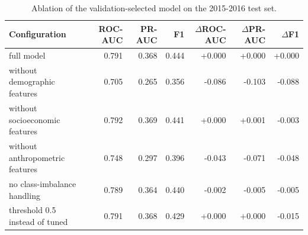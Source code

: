 \begin{table}[t]
\centering
\footnotesize
\caption{Ablation of the validation-selected model on the 2015-2016 test set.}
\label{tab:ablation}
\begin{tabular}{lrrrrrr}
\toprule
Configuration & ROC-AUC & PR-AUC & F1 & $\Delta$ROC-AUC & $\Delta$PR-AUC & $\Delta$F1 \\
\midrule
full model & 0.791 & 0.368 & 0.444 & +0.000 & +0.000 & +0.000 \\
without demographic features & 0.705 & 0.265 & 0.356 & -0.086 & -0.103 & -0.088 \\
without socioeconomic features & 0.792 & 0.369 & 0.441 & +0.000 & +0.001 & -0.003 \\
without anthropometric features & 0.748 & 0.297 & 0.396 & -0.043 & -0.071 & -0.048 \\
no class-imbalance handling & 0.789 & 0.364 & 0.440 & -0.002 & -0.005 & -0.005 \\
threshold 0.5 instead of tuned & 0.791 & 0.368 & 0.429 & +0.000 & +0.000 & -0.015 \\
\bottomrule
\end{tabular}
\end{table}

